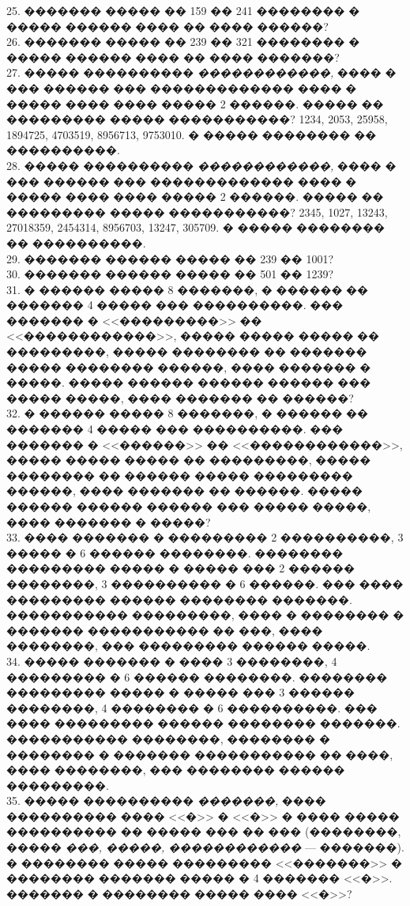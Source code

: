 \documentclass[12pt]{article}
\begin{document}
25. ������� ����� �� 159 �� 241 �������� � ����� ������ ���� �� ���� ������?\\
26. ������� ����� �� 239 �� 321 �������� � ����� ������ ���� �� ���� �������?\\
27. ����� ���������� {\it ������������,} ���� � ��� ������ ��� ������������� ���� � ����� ���� ���� ����� 2 ������. ����� �� ��������� ����� �����������? 1234, 2053, 25958, 1894725, 4703519, 8956713, 9753010. � ����� �������� �� ����������.\\
28. ����� ���������� {\it ������������,} ���� � ��� ������ ��� ������������� ���� � ����� ���� ���� ����� 2 ������. ����� �� ��������� ����� �����������? 2345, 1027, 13243, 27018359, 2454314, 8956703, 13247, 305709. � ����� �������� �� ����������.\\
29. ������� ������ ����� �� 239 �� 1001?\\
30. ������� ������ ����� �� 501 �� 1239?\\
31. � ������ ����� 8 �������, � ������ �� ������� 4 ����� ��� ����������. ��� ������� � <<���������>> �� <<������������>>, ����� ����� ����� �� ���������, ����� �������� �� ������� ����� �������� ������, ���� ������� � �����. ����� ������ ������ ������ ��� ����� �����, ���� ������� �� ������?\\
32. � ������ ����� 8 �������, � ������ �� ������� 4 ����� ��� ����������. ��� ������� � <<������>> �� <<������������>>, ����� ����� ����� �� ���������, ����� �������� �� ������ ����� ��������� ������, ���� ������� �� ������. ����� ������ ������ ������ ��� ����� �����, ���� ������� � �����?\\
33. ���� ������� � ��������� 2 ����������, 3 ����� � 6 ������ ��������. �������� ��������� ����� � ����� ��� 2 ������ ��������, 3 ���������� � 6 ������. ��� ���� ��������� ������ �������� �������. ����������� ���������, ���� � �������� � ������� ����������� �� ���, ���� ��������, ��� ��������� ������ �����.\\
34. ����� ������� � ���� 3 ��������, 4 ��������� � 6 ������ ��������. �������� ��������� ����� � ����� ��� 3 ������ ��������, 4 �������� � 6 ����������. ��� ���� ��������� ������ �������� �������. ����������� ��������, �������� � �������� � ������� ����������� �� ����, ���� ��������, ��� �������� ������ ���������.\\
35. ����� ���������� {\it �������,} ���� ���������� ���� <<�>> � <<�>> � ���� ����� ���������� �� ����� ��� �� ��� (��������, ����� {\it ���, �����, ������������} --- �������). � �������� ����� ��������� <<�������>> � �������� ������� ����� � 4 ������� <<�>>. ������� � �������� ����� ���� <<�>>?\\
\end{document}
